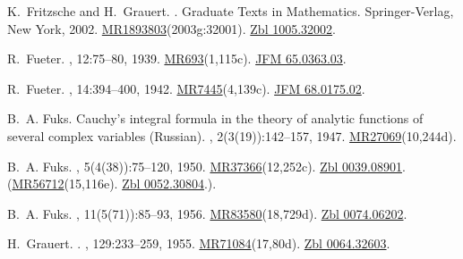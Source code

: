 \documentclass[11pt,a4paper, final, twoside]{article}
\numberwithin{equation}{section}
\begin{document}
\begin{appendices}
\begin{thebibliography}{100}
K.~Fritzsche and H.~Grauert.
.
\newblock Graduate Texts in Mathematics. Springer-Verlag, New York, 2002.
\newblock
  \href{http://www.ams.org/mathscinet-getitem?mr=1893803}{MR1893803}(2003g:32001).
  \href{http://zbmath.org/?q=an:1005.32002}{Zbl 1005.32002}.

R.~Fueter.
, 12:75--80, 1939.
\newblock \href{http://www.ams.org/mathscinet-getitem?mr=693}{MR693}(1,115c).
  \href{http://zbmath.org/?q=an:65.0363.03}{JFM 65.0363.03}.

R.~Fueter.
, 14:394--400, 1942.
\newblock \href{http://www.ams.org/mathscinet-getitem?mr=7445}{MR7445}(4,139c).
  \href{http://zbmath.org/?q=an:68.0175.02}{JFM 68.0175.02}.

B.~A. Fuks.
\newblock Cauchy's integral formula in the theory of analytic functions of
  several complex variables ({R}ussian).
, 2(3(19)):142--157, 1947.
\newblock
  \href{http://www.ams.org/mathscinet-getitem?mr=27069}{MR27069}(10,244d).

B.~A. Fuks.
, 5(4(38)):75--120, 1950.
\newblock
  \href{http://www.ams.org/mathscinet-getitem?mr=37366}{MR37366}(12,252c).
  \href{http://zbmath.org/?q=an:0039.08901}{Zbl 0039.08901}.
  (\href{http://www.ams.org/mathscinet-getitem?mr=56712}{MR56712}(15,116e).
  \href{http://zbmath.org/?q=an:0052.30804}{Zbl 0052.30804}.).

B.~A. Fuks.
, 11(5(71)):85--93, 1956.
\newblock
  \href{http://www.ams.org/mathscinet-getitem?mr=83580}{MR83580}(18,729d).
  \href{http://zbmath.org/?q=an:0074.06202}{Zbl 0074.06202}.

H.~Grauert.
.
, 129:233--259, 1955.
\newblock
  \href{http://www.ams.org/mathscinet-getitem?mr=71084}{MR71084}(17,80d).
  \href{http://zbmath.org/?q=an:0064.32603}{Zbl 0064.32603}.


\end{thebibliography}
\end{appendices}
\end{document}
